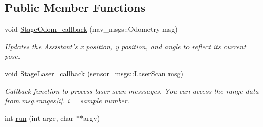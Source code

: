 \subsection*{Public Member Functions}
\begin{DoxyCompactItemize}
\item 
void \hyperlink{classAssistant_ad016061136f3fa5c3ed733e23a54aa00}{Stage\-Odom\-\_\-callback} (nav\-\_\-msgs\-::\-Odometry msg)
\begin{DoxyCompactList}\small\item\em Updates the \hyperlink{classAssistant}{Assistant}'s x position, y position, and angle to reflect its current pose. \end{DoxyCompactList}\item 
void \hyperlink{classAssistant_aaf1fe61dc3d3aac3f0ec603531ad9ad7}{Stage\-Laser\-\_\-callback} (sensor\-\_\-msgs\-::\-Laser\-Scan msg)
\begin{DoxyCompactList}\small\item\em Callback function to process laser scan messsages. You can access the range data from msg.\-ranges\mbox{[}i\mbox{]}. i = sample number. \end{DoxyCompactList}\item 
\hypertarget{classAssistant_a50eec4c3693b7b2c7d363ef4848a5815}{int \hyperlink{classAssistant_a50eec4c3693b7b2c7d363ef4848a5815}{run} (int argc, char $\ast$$\ast$argv)}\label{classAssistant_a50eec4c3693b7b2c7d363ef4848a5815}


\end{DoxyCompactItemize}
